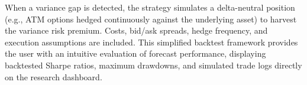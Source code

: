 When a variance gap is detected, the strategy simulates a delta-neutral position (e.g., ATM options hedged continuously against the underlying asset) to harvest the variance risk premium. Costs, bid/ask spreads, hedge frequency, and execution assumptions are included. This simplified backtest framework provides the user with an intuitive evaluation of forecast performance, displaying backtested Sharpe ratios, maximum drawdowns, and simulated trade logs directly on the research dashboard.
